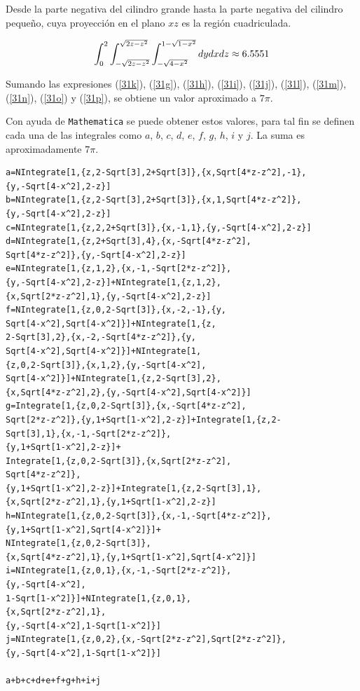 Desde la parte negativa del cilindro grande hasta la parte negativa del cilindro pequeño, cuya proyección en el plano $xz$ es la región cuadriculada.

\begin{equation} \label{31p}
\int_{0}^2\int_{-\sqrt{2z-z^2}}^{\sqrt{2z-z^2}}\int_{-\sqrt{%
4-x^2}}^{1-\sqrt{1-x^2}}dydxdz \approx 6. 5551
\end{equation}

Sumando las expresiones (\ref{31k}), (\ref{31g}), (\ref{31h}), (\ref{31i}), (\ref{31j}), (\ref{31l}), (\ref{31m}), (\ref{31n}),
(\ref{31o}) y (\ref{31p}), se obtiene un valor aproximado a $7\pi$.

Con ayuda de \verb"Mathematica" se puede obtener estos valores, para tal fin se definen cada una de las integrales como $a$, $b$, $c$, $d$, $e$, $f$, $g$, $h$, $i$ y $j$.
La suma es aproximadamente $7\pi$.

\begin{tcolorbox}[title=\bf Instrucción en \verb"Mathematica"]\begin{Verbatim}[formatcom=\letraverbatim]
a=NIntegrate[1,{z,2-Sqrt[3],2+Sqrt[3]},{x,Sqrt[4*z-z^2],-1},
{y,-Sqrt[4-x^2],2-z}]
b=NIntegrate[1,{z,2-Sqrt[3],2+Sqrt[3]},{x,1,Sqrt[4*z-z^2]},
{y,-Sqrt[4-x^2],2-z}]
c=NIntegrate[1,{z,2,2+Sqrt[3]},{x,-1,1},{y,-Sqrt[4-x^2],2-z}]
d=NIntegrate[1,{z,2+Sqrt[3],4},{x,-Sqrt[4*z-z^2],
Sqrt[4*z-z^2]},{y,-Sqrt[4-x^2],2-z}]
e=NIntegrate[1,{z,1,2},{x,-1,-Sqrt[2*z-z^2]},
{y,-Sqrt[4-x^2],2-z}]+NIntegrate[1,{z,1,2},
{x,Sqrt[2*z-z^2],1},{y,-Sqrt[4-x^2],2-z}]
f=NIntegrate[1,{z,0,2-Sqrt[3]},{x,-2,-1},{y,
Sqrt[4-x^2],Sqrt[4-x^2]}]+NIntegrate[1,{z,
2-Sqrt[3],2},{x,-2,-Sqrt[4*z-z^2]},{y,
Sqrt[4-x^2],Sqrt[4-x^2]}]+NIntegrate[1,
{z,0,2-Sqrt[3]},{x,1,2},{y,-Sqrt[4-x^2],
Sqrt[4-x^2]}]+NIntegrate[1,{z,2-Sqrt[3],2},
{x,Sqrt[4*z-z^2],2},{y,-Sqrt[4-x^2],Sqrt[4-x^2]}]
g=Integrate[1,{z,0,2-Sqrt[3]},{x,-Sqrt[4*z-z^2],
Sqrt[2*z-z^2]},{y,1+Sqrt[1-x^2],2-z}]+Integrate[1,{z,2-
Sqrt[3],1},{x,-1,-Sqrt[2*z-z^2]},
{y,1+Sqrt[1-x^2],2-z}]+
Integrate[1,{z,0,2-Sqrt[3]},{x,Sqrt[2*z-z^2],
Sqrt[4*z-z^2]},
{y,1+Sqrt[1-x^2],2-z}]+Integrate[1,{z,2-Sqrt[3],1},
{x,Sqrt[2*z-z^2],1},{y,1+Sqrt[1-x^2],2-z}]
h=NIntegrate[1,{z,0,2-Sqrt[3]},{x,-1,-Sqrt[4*z-z^2]},
{y,1+Sqrt[1-x^2],Sqrt[4-x^2]}]+
NIntegrate[1,{z,0,2-Sqrt[3]},
{x,Sqrt[4*z-z^2],1},{y,1+Sqrt[1-x^2],Sqrt[4-x^2]}]
i=NIntegrate[1,{z,0,1},{x,-1,-Sqrt[2*z-z^2]},
{y,-Sqrt[4-x^2],
1-Sqrt[1-x^2]}]+NIntegrate[1,{z,0,1},
{x,Sqrt[2*z-z^2],1},
{y,-Sqrt[4-x^2],1-Sqrt[1-x^2]}]
j=NIntegrate[1,{z,0,2},{x,-Sqrt[2*z-z^2],Sqrt[2*z-z^2]},
{y,-Sqrt[4-x^2],1-Sqrt[1-x^2]}]

a+b+c+d+e+f+g+h+i+j
\end{Verbatim}
\end{tcolorbox}

